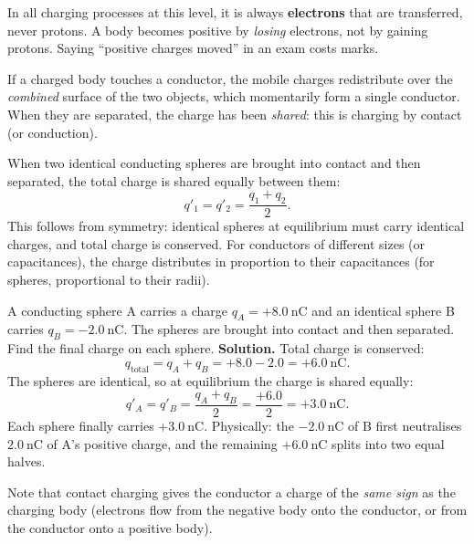 \documentclass[11pt]{article}
\newcommand{\cle}[1]{{\popxbold\color{popdark}#1}}
\newcounter{popsec}
\newcounter{popsub}
\newcommand{\courssub}[1]{%
  \stepcounter{popsub}%
  \par\vspace{9pt}\noindent{\popxbold\fontsize{11.5}{13}\selectfont\color{popink}{\color{poporange}\thepopsec.\thepopsub}\hspace{6pt}#1}\par\nopagebreak\vspace{4pt}
}
\begin{document}
\begin{attention}
In all charging processes at this level, it is always \textbf{electrons} that are transferred, never protons. A body becomes positive by \emph{losing} electrons, not by gaining protons. Saying ``positive charges moved'' in an exam costs marks.
\end{attention}

\courssub{Charging by Contact (Conduction)}

If a charged body touches a conductor, the mobile charges redistribute over the \emph{combined} surface of the two objects, which momentarily form a single conductor. When they are separated, the charge has been \emph{shared}: this is \cle{charging by contact} (or conduction).

\begin{propriete}
When two identical conducting spheres are brought into contact and then separated, the total charge is shared equally between them:
\[
q'_1 = q'_2 = \frac{q_1 + q_2}{2}.
\]
This follows from symmetry: identical spheres at equilibrium must carry identical charges, and total charge is conserved. For conductors of different sizes (or capacitances), the charge distributes in proportion to their capacitances (for spheres, proportional to their radii).
\end{propriete}

\begin{exoresolu}
A conducting sphere A carries a charge $q_A = +8.0\ \mathrm{nC}$ and an identical sphere B carries $q_B = -2.0\ \mathrm{nC}$. The spheres are brought into contact and then separated. Find the final charge on each sphere.
\tcblower
\textbf{Solution.} Total charge is conserved:
\[
q_{\text{total}} = q_A + q_B = +8.0 - 2.0 = +6.0\ \mathrm{nC}.
\]
The spheres are identical, so at equilibrium the charge is shared equally:
\[
q'_A = q'_B = \frac{q_A + q_B}{2} = \frac{+6.0}{2} = +3.0\ \mathrm{nC}.
\]
Each sphere finally carries $+3.0\ \mathrm{nC}$. Physically: the $-2.0\ \mathrm{nC}$ of B first neutralises $2.0\ \mathrm{nC}$ of A's positive charge, and the remaining $+6.0\ \mathrm{nC}$ splits into two equal halves.
\end{exoresolu}

Note that contact charging gives the conductor a charge of the \emph{same sign} as the charging body (electrons flow from the negative body onto the conductor, or from the conductor onto a positive body).
\end{document}
